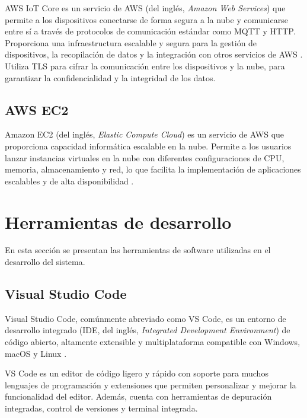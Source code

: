 AWS IoT Core es un servicio de AWS (del inglés, \textit{Amazon Web Services})
que permite a los dispositivos conectarse de forma segura a la nube y
comunicarse entre sí a través de protocolos de comunicación estándar como MQTT
y HTTP. Proporciona una infraestructura escalable y segura para la gestión de
dispositivos, la recopilación de datos y la integración con otros servicios de
AWS \cite{AWS_IoT}. Utiliza TLS para cifrar la comunicación entre los
dispositivos y la nube, para garantizar la confidencialidad y la integridad de
los datos.

\subsection{AWS EC2}

Amazon EC2 (del inglés, \textit{Elastic Compute Cloud}) es un servicio de AWS
que proporciona capacidad informática escalable en la nube. Permite a los
usuarios lanzar instancias virtuales en la nube con diferentes configuraciones
de CPU, memoria, almacenamiento y red, lo que facilita la implementación de
aplicaciones escalables y de alta disponibilidad \cite{AWS_EC2}.


\section{Herramientas de desarrollo}

En esta sección se presentan las herramientas de software utilizadas en el
desarrollo del sistema.

\subsection{Visual Studio Code}

Visual Studio Code, comúnmente abreviado como VS Code, es un entorno de
desarrollo integrado (IDE, del inglés, \textit{Integrated Development
	Environment}) de código abierto, altamente extensible y multiplataforma
compatible con Windows, macOS y Linux \cite{VSCode}.

VS Code es un editor de código ligero y rápido con soporte para muchos
lenguajes de programación y extensiones que permiten personalizar y mejorar la
funcionalidad del editor. Además, cuenta con herramientas de depuración
integradas, control de versiones y terminal integrada.%

